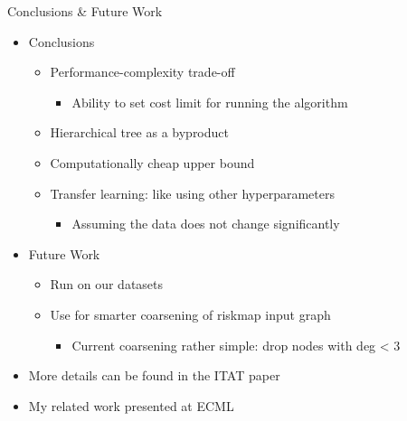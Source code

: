 \documentclass[10pt]{beamer}
\begin{document}
\begin{frame}{Conclusions \& Future Work}
    \begin{itemize}
        \item Conclusions
        \begin{itemize}
            \item Performance-complexity trade-off
            \begin{itemize}
                \item Ability to set cost limit for running the algorithm
            \end{itemize}
            \item Hierarchical tree as a byproduct
            \item Computationally cheap upper bound
            \item Transfer learning: like using other hyperparameters
            \begin{itemize}
                \item Assuming the data does not change significantly
            \end{itemize}
        \end{itemize}
        
        \item Future Work
        \begin{itemize}
            \item Run on our datasets
            \item Use for smarter coarsening of riskmap input graph
            \begin{itemize}
                \item Current coarsening rather simple: drop nodes with deg < 3  
            \end{itemize}
        \end{itemize}
        
    \item More details can be found in the ITAT paper \cite{prochazka_scalable_2022}
    \item My related work presented at ECML \cite{dedic_adaptive_2022}
    \end{itemize}
\end{frame}

\begin{frame}
	\titlepage
\end{frame}
\end{document}

